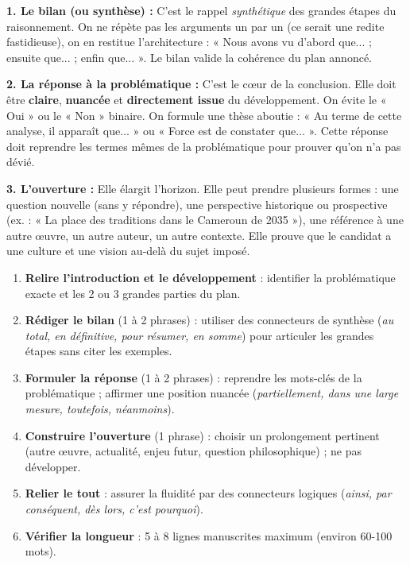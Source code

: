\documentclass[11pt]{article}
\begin{document}
\textbf{1. Le bilan (ou synthèse) :} C'est le rappel \emph{synthétique} des grandes étapes du raisonnement. On ne répète pas les arguments un par un (ce serait une redite fastidieuse), on en restitue l'architecture : « Nous avons vu d'abord que... ; ensuite que... ; enfin que... ». Le bilan valide la cohérence du plan annoncé.

\textbf{2. La réponse à la problématique :} C'est le cœur de la conclusion. Elle doit être \textbf{claire}, \textbf{nuancée} et \textbf{directement issue} du développement. On évite le « Oui » ou le « Non » binaire. On formule une thèse aboutie : « Au terme de cette analyse, il apparaît que... » ou « Force est de constater que... ». Cette réponse doit reprendre les termes mêmes de la problématique pour prouver qu'on n'a pas dévié.

\textbf{3. L'ouverture :} Elle élargit l'horizon. Elle peut prendre plusieurs formes : une question nouvelle (sans y répondre), une perspective historique ou prospective (ex. : « La place des traditions dans le Cameroun de 2035 »), une référence à une autre œuvre, un autre auteur, un autre contexte. Elle prouve que le candidat a une culture et une vision au-delà du sujet imposé.

\begin{methode}
\begin{enumerate}
    \item \textbf{Relire l'introduction et le développement} : identifier la problématique exacte et les 2 ou 3 grandes parties du plan.
    \item \textbf{Rédiger le bilan} (1 à 2 phrases) : utiliser des connecteurs de synthèse (\emph{au total, en définitive, pour résumer, en somme}) pour articuler les grandes étapes sans citer les exemples.
    \item \textbf{Formuler la réponse} (1 à 2 phrases) : reprendre les mots-clés de la problématique ; affirmer une position nuancée (\emph{partiellement, dans une large mesure, toutefois, néanmoins}).
    \item \textbf{Construire l'ouverture} (1 phrase) : choisir un prolongement pertinent (autre œuvre, actualité, enjeu futur, question philosophique) ; ne pas développer.
    \item \textbf{Relier le tout} : assurer la fluidité par des connecteurs logiques (\emph{ainsi, par conséquent, dès lors, c'est pourquoi}).
    \item \textbf{Vérifier la longueur} : 5 à 8 lignes manuscrites maximum (environ 60-100 mots).
\end{enumerate}
\end{methode}
\end{document}

